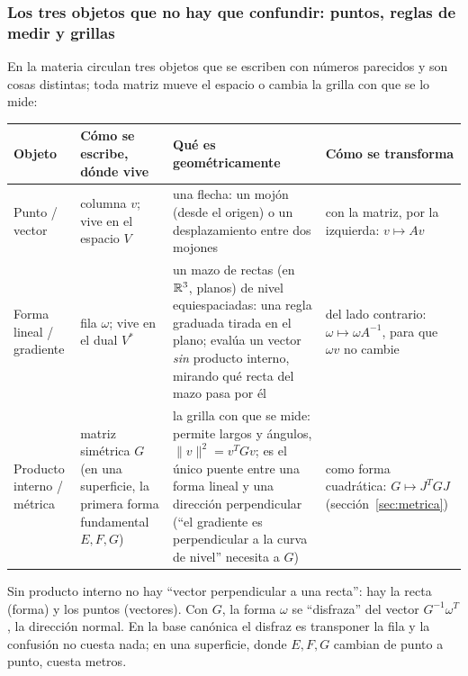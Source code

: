 \subsubsection{Los tres objetos que no hay que confundir: puntos, reglas de medir y grillas}\label{sec:puntos-formas-grillas}

{\small\vspace{1mm}\par}

En la materia circulan tres objetos que se escriben con números parecidos y son cosas
distintas; toda matriz mueve el espacio o cambia la grilla con que se lo mide:

{\small
\begin{tabularx}{\textwidth}{>{\bfseries\raggedright\arraybackslash}p{27mm}>{\raggedright\arraybackslash}p{30mm}YY}
\toprule
Objeto & Cómo se escribe, dónde vive & Qué es geométricamente & Cómo se transforma\\
\midrule
Punto / vector & columna \(v\); vive en el espacio \(V\) &
una flecha: un mojón (desde el origen) o un desplazamiento entre dos mojones &
con la matriz, por la izquierda: \(v\mapsto Av\)\\
Forma lineal / gradiente & fila \(\omega\); vive en el dual \(V^{*}\) &
un mazo de rectas (en \(\mathbb{R}^3\), planos) de nivel equiespaciadas: una regla graduada
tirada en el plano; evalúa un vector \emph{sin} producto interno, mirando qué recta del
mazo pasa por él &
del lado contrario: \(\omega\mapsto\omega A^{-1}\), para que \(\omega v\) no cambie\\
Producto interno / métrica & matriz simétrica \(G\) (en una superficie, la primera forma
fundamental \(E,F,G\)) &
la grilla con que se mide: permite largos y ángulos, \(\|v\|^2=v^TGv\); es el único
puente entre una forma lineal y una dirección perpendicular (\enquote{el gradiente es
perpendicular a la curva de nivel} necesita a \(G\)) &
como forma cuadrática: \(G\mapsto J^TGJ\) (sección~\ref{sec:metrica})\\
\bottomrule
\end{tabularx}
}

Sin producto interno no hay \enquote{vector perpendicular a una recta}: hay la recta (forma)
y los puntos (vectores). Con \(G\), la forma \(\omega\) se \enquote{disfraza} del vector
\(G^{-1}\omega^T\), la dirección normal. En la base canónica el disfraz es transponer la fila y
la confusión no cuesta nada; en una superficie, donde \(E,F,G\) cambian de punto a punto,
cuesta metros.


